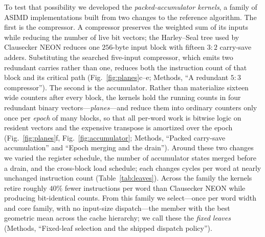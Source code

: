 \documentclass[fleqn,10pt]{wlscirep}
\begin{document}
To test that possibility we developed the \emph{packed-accumulator kernels}, a family of ASIMD implementations built from two changes to the reference algorithm. The first is the compressor. A compressor preserves the weighted sum of its inputs while reducing the number of live bit vectors; the Harley--Seal tree used by Clausecker NEON reduces one $256$-byte input block with fifteen $3{:}2$ carry-save adders. Substituting the searched five-input compressor, which emits two redundant carries rather than one, reduces both the instruction count of that block and its critical path (Fig.~\ref{fig:planes}c--e; Methods, ``A redundant $5{:}3$ compressor''). The second is the accumulator. Rather than materialize sixteen wide counters after every block, the kernels hold the running counts in four redundant binary vectors---\emph{planes}---and reduce them into ordinary counters only once per \emph{epoch} of many blocks, so that all per-word work is bitwise logic on resident vectors and the expensive transpose is amortized over the epoch (Fig.~\ref{fig:planes}f, Fig.~\ref{fig:accumulator}; Methods, ``Packed carry-save accumulation'' and ``Epoch merging and the drain''). Around these two changes we varied the register schedule, the number of accumulator states merged before a drain, and the cross-block load schedule; each changes cycles per word at nearly unchanged instruction count (Table~\ref{tab:leaves}). Across the family the kernels retire roughly $40\%$ fewer instructions per word than Clausecker NEON while producing bit-identical counts. From this family we select---once per word width and core family, with no input-size dispatch---the member with the best geometric mean across the cache hierarchy; we call these the \emph{fixed leaves} (Methods, ``Fixed-leaf selection and the shipped dispatch policy'').
\end{document}
